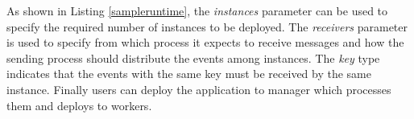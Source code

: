 

As shown in Listing \ref{sampleruntime}, the \textit{instances} parameter can be used to specify the required number of instances to be deployed. The \textit{receivers} parameter is used to specify from which process it expects to receive messages and how the sending process should distribute the events among instances. The \textit{key} type indicates that the events with the same key must be received by the same instance. Finally users can deploy the application to manager which processes them and deploys to workers.






 

